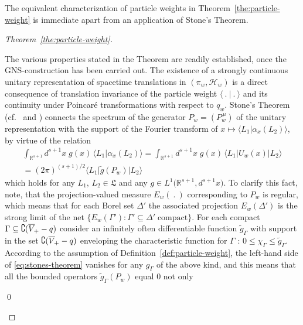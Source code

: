 \documentclass[a4paper,a4paper]{article}
\numberwithin{equation}{section}
\newcommand{\Lfrak}{\mathfrak{L}}
\newcommand{\Hscr}{\mathscr{H}}
\newcommand{\Rsone}{\mathbb{R}^{s + 1}}
\newcommand{\fwcone}{\overline{V}_{\negthinspace +}}
\newcommand{\EwDprime}{E_w ( \Delta' )}
\newcommand{\ax}{\alpha_x}
\newcounter{Proofitem}
\newenvironment{Prooflist}{\begin{list}{Part (\Roman{Proofitem}):}%
  {\usecounter{Proofitem} \setlength{\topsep}{0ex}%
   \setlength{\parsep}{0.2ex} \setlength{\itemsep}{0.4ex}%
   \setlength{\leftmargin}{0em} \setlength{\itemindent}{0.5em}%
   \setlength{\listparindent}{1em}}}{\qed \end{list}}
\theoremstyle{definition}
\theoremstyle{plain}
\theoremstyle{remark}
\newcommand{\bset}[1]{\bigl\{ #1 \bigr\}}
\newcommand{\scp}[2]{\langle #1 \vert #2 \rangle}
\newcommand{\bscp}[2]{\bigl\langle #1 \big\vert #2 \bigr\rangle}
\newcommand{\bscpx}[3]{\bigl\langle #1 \big\vert #2 \big\vert #3
  \bigr\rangle}
\begin{document}
  The equivalent characterization of particle weights in
  Theorem~\ref{the:particle-weight} is immediate apart from an
  application of Stone's Theorem. 
  \begin{proof}[Theorem~\ref{the:particle-weight}]
    \begin{Prooflist}
    \item The various properties stated in the Theorem are readily
      established, once the GNS-construction has been carried out.
      The existence of a strongly continuous unitary representation of
      spacetime translations in $( \pi_w , \Hscr_w )$ is a direct
      consequence of translation invariance of the particle weight
      $\scp{~.~}{~.~}$ and its continuity under Poincar\'e
      transformations with respect to $q_w$. Stone's Theorem
      (cf.~\cite[Chapter~6, \S\,2]{barut/raczka:1980} and
      \cite[Theorem~VIII.(33.8)]{hewitt/ross:1970}) connects the
      spectrum of the generator $P_w = ( P_w^{\, \mu} )$ of the
      unitary representation with the support of the Fourier transform
      of $x \mapsto \bscp{L_1}{\ax ( L_2 )}$, by virtue of the
      relation
      \begin{multline}
        \label{eq:stones-theorem}
        \int_{\Rsone} d^{s + 1} x \; g ( x ) \, \bscp{L_1}{\ax ( L_2
        )} = \int_{\Rsone} d^{s + 1} x \; g ( x ) \, \bscpx{L_1}{U_w (
        x )}{L_2} \\
        = ( 2 \pi )^{( s + 1 )/2} \bscpx{L_1}{\tilde{g} ( P_w )}{L_2}
      \end{multline}
      which holds for any $L_1$, $L_2 \in \Lfrak$ and any $g \in L^1
      \bigl( \Rsone , d^{s + 1} x \bigr)$. To clarify this fact, note,
      that the projection-valued measure $E_w (~.~)$ corresponding to
      $P_w$ is regular, which means that for each Borel set $\Delta'$
      the associated projection $\EwDprime$ is the strong limit of the
      net $\bset{E_w ( \Gamma' ) : \Gamma' \subseteq \Delta' \;
      \text{compact}}$.  For each compact $\Gamma \subseteq
      \complement ( \fwcone - q )$ consider an infinitely often
      differentiable function $\tilde{g}_\Gamma$ with support in the
      set $\complement ( \fwcone - q )$ enveloping the characteristic
      function for $\Gamma$ \cite[Satz~7.7]{jantscher:1971}: $0
      \leqslant \chi_\Gamma \leqslant \tilde{g}_\Gamma$. According to
      the assumption of Definition~\ref{def:particle-weight}, the
      left-hand side of \eqref{eq:stones-theorem} vanishes for any
      $g_\Gamma$ of the above kind, and this means that all the
      bounded operators $\tilde{g}_\Gamma ( P_w )$ equal $0$ not only

\end{Prooflist}
\end{proof}
\end{document}
